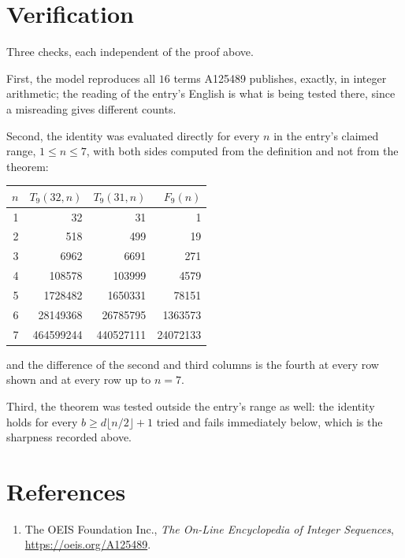 \documentclass[11pt,a4paper]{article}
\theoremstyle{plain}
\theoremstyle{definition}
\begin{document}
\section{Verification}

Three checks, each independent of the proof above.

First, the model reproduces all $16$ terms A125489 publishes, exactly, in integer
arithmetic; the reading of the entry's English is what is being tested there, since a
misreading gives different counts.

Second, the identity was evaluated directly for every $n$ in the entry's claimed range,
$1\le n\le7$, with both sides computed from the definition and not from the theorem:

\begin{center}
\begin{tabular}{rrrr}
$n$ & $T_{9}(32,n)$ & $T_{9}(31,n)$ & $F_{9}(n)$ \\ \hline
1 & 32 & 31 & 1 \\
2 & 518 & 499 & 19 \\
3 & 6962 & 6691 & 271 \\
4 & 108578 & 103999 & 4579 \\
5 & 1728482 & 1650331 & 78151 \\
6 & 28149368 & 26785795 & 1363573 \\
7 & 464599244 & 440527111 & 24072133 \\
\end{tabular}
\end{center}

\noindent and the difference of the second and third columns is the fourth at every row shown
and at every row up to $n=7$.

Third, the theorem was tested outside the entry's range as well: the identity holds for every
$b\ge d\lfloor n/2\rfloor+1$ tried and fails immediately below, which is the sharpness recorded
above.

\section*{References}
\begin{enumerate}
\item The OEIS Foundation Inc., \emph{The On-Line Encyclopedia of Integer Sequences},
\url{https://oeis.org/A125489}.
\end{enumerate}
\end{document}
